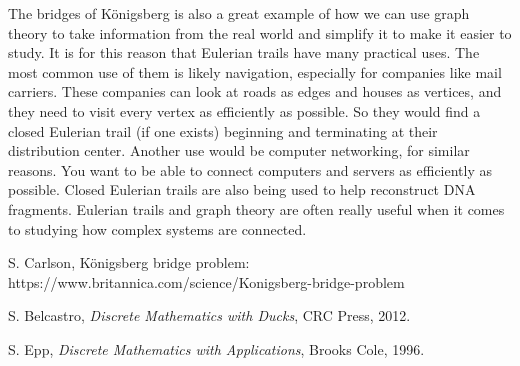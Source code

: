 \documentclass[10pt]{amsart}
\begin{document}
The bridges of K\"{o}nigsberg is also a great example of how we can use graph theory to take information
from the real world and simplify it to make it easier to study. It is for this reason that Eulerian trails
have many practical uses. The most common use of them is likely navigation, especially for companies 
like mail carriers. These companies can look at roads as edges and houses as vertices, and they need
to visit every vertex as efficiently as possible. So they would find a closed Eulerian trail (if one
exists) beginning and terminating at their distribution center. Another use would be computer networking,
for similar reasons. You want to be able to connect computers and servers as efficiently as
possible. Closed Eulerian trails are also being used to help reconstruct DNA fragments. Eulerian trails
and graph theory are often really useful when it comes to studying how complex systems are connected.



\begin{thebibliography}{10}

 S. Carlson, K\"{o}nigsberg bridge problem: https://www.britannica.com/science/Konigsberg-bridge-problem

 S. Belcastro, {\it Discrete Mathematics with Ducks}, CRC Press, 2012.

 S. Epp, {\it Discrete Mathematics with Applications}, Brooks Cole, 1996.

\end{thebibliography}
\end{document}

